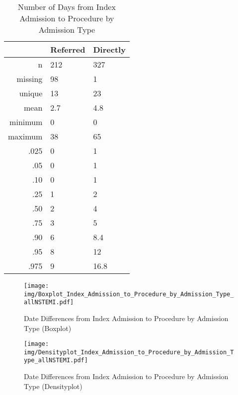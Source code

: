\documentclass[a4paper]{report}
\begin{document}
\begin{itemize}
{%
\begin{table}[ht]
\centering
\begin{tabular}{rll}
  \toprule
 & Referred & Directly \\ 
  \midrule
n & 212 & 327 \\ 
  missing & 98 & 1 \\ 
  unique & 13 & 23 \\ 
  mean & 2.7 & 4.8 \\ 
  minimum & 0 & 0 \\ 
  maximum & 38 & 65 \\ 
  .025 & 0 & 1 \\ 
  .05 & 0 & 1 \\ 
  .10 & 0 & 1 \\ 
  .25 & 1 & 2 \\ 
  .50 & 2 & 4 \\ 
  .75 & 3 & 5 \\ 
  .90 & 6 & 8.4 \\ 
  .95 & 8 & 12 \\ 
  .975 & 9 & 16.8 \\ 
   \bottomrule
\end{tabular}
\caption{Number of Days from Index Admission to Procedure by Admission Type} 
\end{table}
\begin{figure}
  \centering
  \caption{Date Differences from Index Admission to Procedure by Admission Type (Boxplot)}
  \label{Boxplot: Date Differences from Index Admission to Procedure by Admission Type}
\texttt{[image: img/Boxplot\_Index\_Admission\_to\_Procedure\_by\_Admission\_Type\_allNSTEMI.pdf]}\end{figure}


\begin{figure}
  \centering
  \caption{Date Differences from Index Admission to Procedure by Admission Type (Densityplot)}
  \label{Density: Date Differences from Index Admission to Procedure by Admission Type}
\texttt{[image: img/Densityplot\_Index\_Admission\_to\_Procedure\_by\_Admission\_Type\_allNSTEMI.pdf]}\end{figure}



\clearpage

}
\end{itemize}
\end{document}
